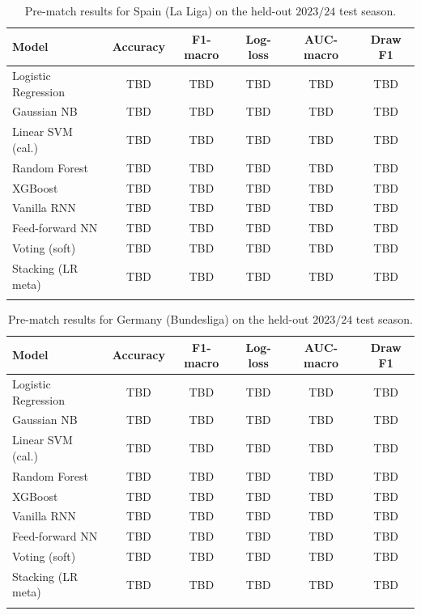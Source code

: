 \documentclass[pdflatex,sn-mathphys-num]{sn-jnl}
\theoremstyle{thmstyleone}
\theoremstyle{thmstyletwo}
\theoremstyle{thmstylethree}
\begin{document}
\begin{table}[h]
\caption{Pre-match results for Spain (La Liga) on the held-out
$2023/24$ test season.}\label{tab:pre-esp}
\begin{tabular}{@{}lccccc@{}}
\toprule
Model               & Accuracy & F1-macro & Log-loss & AUC-macro & Draw F1 \\
\midrule
Logistic Regression & TBD & TBD & TBD & TBD & TBD \\
Gaussian NB         & TBD & TBD & TBD & TBD & TBD \\
Linear SVM (cal.)   & TBD & TBD & TBD & TBD & TBD \\
Random Forest       & TBD & TBD & TBD & TBD & TBD \\
XGBoost             & TBD & TBD & TBD & TBD & TBD \\
Vanilla RNN         & TBD & TBD & TBD & TBD & TBD \\
Feed-forward NN     & TBD & TBD & TBD & TBD & TBD \\
\midrule
Voting (soft)       & TBD & TBD & TBD & TBD & TBD \\
Stacking (LR meta)  & TBD & TBD & TBD & TBD & TBD \\
\botrule
\end{tabular}
\end{table}

\begin{table}[h]
\caption{Pre-match results for Germany (Bundesliga) on the held-out
$2023/24$ test season.}\label{tab:pre-ger}
\begin{tabular}{@{}lccccc@{}}
\toprule
Model               & Accuracy & F1-macro & Log-loss & AUC-macro & Draw F1 \\
\midrule
Logistic Regression & TBD & TBD & TBD & TBD & TBD \\
Gaussian NB         & TBD & TBD & TBD & TBD & TBD \\
Linear SVM (cal.)   & TBD & TBD & TBD & TBD & TBD \\
Random Forest       & TBD & TBD & TBD & TBD & TBD \\
XGBoost             & TBD & TBD & TBD & TBD & TBD \\
Vanilla RNN         & TBD & TBD & TBD & TBD & TBD \\
Feed-forward NN     & TBD & TBD & TBD & TBD & TBD \\
\midrule
Voting (soft)       & TBD & TBD & TBD & TBD & TBD \\
Stacking (LR meta)  & TBD & TBD & TBD & TBD & TBD \\
\botrule
\end{tabular}
\end{table}
\end{document}
